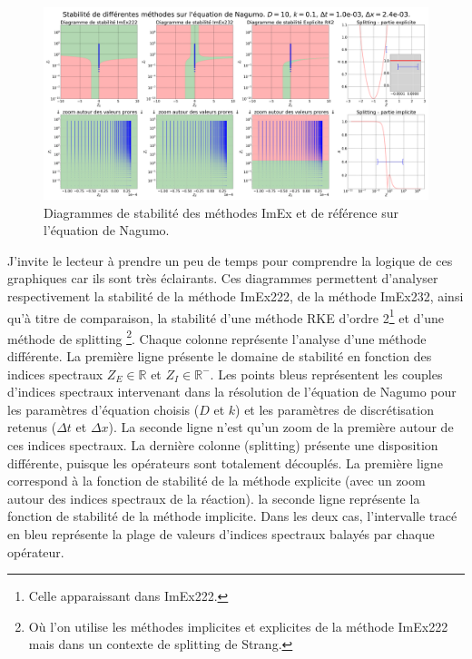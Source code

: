         \begin{figure}[htbp]
            \centering
            \includegraphics[width=\textwidth]{media/4_travail/2_nagumo/stabilite/STABILITE_D10_k0.1_dt1.0e-03_dx2.4e-03.png}
            \caption{Diagrammes de stabilité des méthodes ImEx et de référence sur l'équation de Nagumo.}
            \label{fig:stabilite_nagumo}
        \end{figure}

        J'invite le lecteur à prendre un peu de temps pour comprendre la logique de ces graphiques car ils sont très éclairants. 
        Ces diagrammes permettent d'analyser respectivement la stabilité de la méthode ImEx222, de la méthode ImEx232, 
        ainsi qu'à titre de comparaison, la stabilité d'une méthode RKE d'ordre 2\footnote{Celle apparaissant dans ImEx222.} 
        et d'une méthode de splitting
        \footnote{Où l'on utilise les méthodes implicites et explicites de la méthode ImEx222 mais dans un contexte de splitting de Strang.}.
        Chaque colonne représente l'analyse d'une méthode différente. 
        La première ligne présente le domaine de stabilité en fonction des indices spectraux $Z_E \in \mathbb{R}$ et $Z_I \in \mathbb{R}^-$. 
        Les points bleus représentent les couples d'indices spectraux intervenant dans la résolution de l'équation de Nagumo 
        pour les paramètres d'équation choisis ($D$ et $k$) et les paramètres de discrétisation retenus ($\Delta t$ et $\Delta x$). 
        La seconde ligne n'est qu'un zoom de la première autour de ces indices spectraux. 
        La dernière colonne (splitting) présente une disposition différente, puisque les opérateurs sont totalement découplés.
        La première ligne correspond à la fonction de stabilité de la méthode explicite (avec un zoom autour des indices spectraux de la réaction).
        la seconde ligne représente la fonction de stabilité de la méthode implicite. 
        Dans les deux cas, l'intervalle tracé en bleu représente la plage de valeurs d'indices spectraux balayés par chaque opérateur.